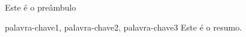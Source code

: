 \documentclass[tesedr]{eesc}
\begin{document}
\pretextual

\maketitle

\begin{preambulo}
	
Este é o preâmbulo

\end{preambulo}


\begin{resumo}{palavra-chave1, palavra-chave2, palavra-chave3}
Este é o resumo.

\end{resumo}

\begin{abstract}{palavra-chave2. palavra-chave2. palavra-chave2}
This is the english abstract.
	
\end{abstract}






\end{document}
